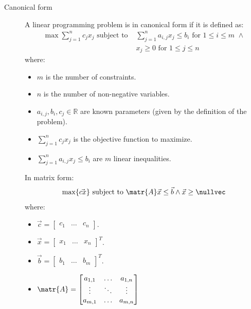 \begin{description}
    
    \item[Canonical form] 
        A linear programming problem is in canonical form if it is defined as:
        \[ 
            \begin{split}
                \max \sum_{j=1}^{n} c_j x_j \text{ subject to } &\sum_{j=1}^{n} a_{i,j} x_j \leq b_i \text{ for } 1 \leq i \leq m \,\,\land \\
                    & x_j \geq 0 \text{ for } 1 \leq j \leq n
            \end{split}
        \]
        where:
        \begin{itemize}
            \item $m$ is the number of constraints.
            \item $n$ is the number of non-negative variables.
            \item $a_{i,j}, b_i, c_j \in \mathbb{R}$ are known parameters (given by the definition of the problem).
            \item $\sum_{j=1}^{n} c_j x_j$ is the objective function to maximize.
            \item $\sum_{j=1}^{n} a_{i,j} x_j \leq b_i$ are $m$ linear inequalities.
        \end{itemize}

        In matrix form:
        \[ \max \{ \vec{cx} \} \text{ subject to } \matr{A}\vec{x} \leq \vec{b} \land \vec{x} \geq \nullvec \]
        where:
        \begin{itemize}
            \item $\vec{c} = \begin{bmatrix} c_1 & \hdots & c_n \end{bmatrix}$.
            \item $\vec{x} = \begin{bmatrix} x_1 & \hdots & x_n \end{bmatrix}^T$.
            \item $\vec{b} = \begin{bmatrix} b_1 & \hdots & b_m \end{bmatrix}^T$.
            \item $\matr{A} = \begin{bmatrix} a_{1,1} & \hdots & a_{1,n} \\ \vdots & \ddots & \vdots \\ a_{m,1} & \hdots & a_{m,n} \end{bmatrix}$
        \end{itemize}



\end{description}
